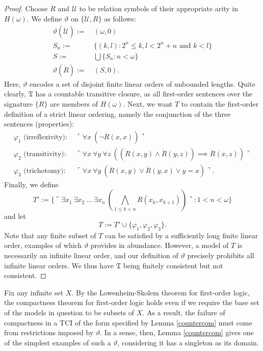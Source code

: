 \documentclass[12pt]{article}
\numberwithin{equation}{section}
\begin{document}
\begin{proof}
Choose $\dot{R}$ and $\dot{\mathcal{U}}$ to be relation symbols of their appropriate arity in $H(\omega)$. We define $\vartheta$ on $\{\dot{\mathcal{U}}, \dot{R}\}$ as follows:
\begin{align*}
    \vartheta(\dot{\mathcal{U}}) := \ & (\omega, 0) \\
    S_n :=  \ & \{(k,l) : 2^n \leq k, l < 2^n + n \text{ and } k < l\} \\
    S := \ & \bigcup \{S_n : n < \omega\} \\
    \vartheta(\dot{R}) := \ & (S, 0).
\end{align*}
Here, $\vartheta$ encodes a set of disjoint finite linear orders of unbounded lengths. Quite clearly, $\mathfrak{T}$ has a countable transitive closure, as all first-order sentences over the signature $\{\dot{R}\}$ are members of $H(\omega)$. Next, we want $T$ to contain the first-order definition of a strict linear ordering, namely the conjunction of the three sentences (properties):
\begin{align*}
    \varphi_1 \text{ (irreflexivity)} : \ & \ulcorner \forall x \ (\neg \dot{R}(x, x)) \urcorner \\
    \varphi_2 \text{ (transitivity)} : \ & \ulcorner \forall x \ \forall y \ \forall z \ ((\dot{R}(x, y) \wedge \dot{R}(y, z)) \implies \dot{R}(x, z)) \urcorner \\
    \varphi_3 \text{ (trichotomy)} : \ & \ulcorner \forall x \ \forall y \ (\dot{R}(x, y) \vee \dot{R}(y, x) \vee y = x) \urcorner.
\end{align*}
Finally, we define $$T' := \{\ulcorner \exists x_1 \ \exists x_2 \ ... \ \exists x_n \ (\bigwedge_{1 \leq k < n} \dot{R}(x_{k}, x_{k + 1})) \urcorner : 1 < n < \omega\}$$ and let $$T := T' \cup \{\varphi_1, \varphi_2, \varphi_3\}.$$ Note that any finite subset of $T$ can be satisfied by a sufficiently long finite linear order, examples of which $\vartheta$ provides in abundance. However, a model of $T$ is necessarily an infinite linear order, and our definition of $\vartheta$ precisely prohibits all infinite linear orders. We thus have $\mathfrak{T}$ being finitely consistent but not consistent.
\end{proof}

Fix any infinite set $X$. By the Lowenheim-Skolem theorem for first-order logic, the compactness theorem for first-order logic holds even if we require the base set of the models in question to be subsets of $X$. As a result, the failure of compactness in a TCI of the form specified by Lemma \ref{countercom} must come from restrictions imposed by $\vartheta$. In a sense, then, Lemma \ref{countercom} gives one of the simplest examples of such a $\vartheta$, considering it has a singleton as its domain.
\end{document}
